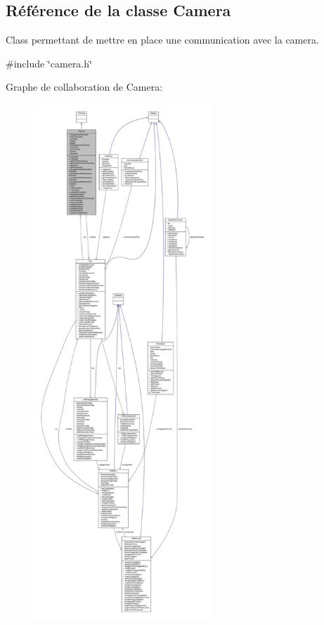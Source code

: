 \hypertarget{class_camera}{}\subsection{Référence de la classe Camera}
\label{class_camera}


Class permettant de mettre en place une communication avec la camera.  




{\ttfamily \#include \char`\"{}camera.\+h\char`\"{}}



Graphe de collaboration de Camera\+:
\nopagebreak
\begin{figure}[H]
\begin{center}
\leavevmode
\includegraphics[height=550pt]{class_camera__coll__graph}
\end{center}
\end{figure}
